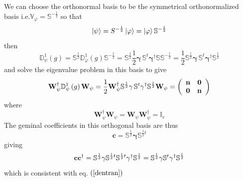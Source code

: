 \documentclass[aps,preprint]{revtex4}
\begin{document}
We can choose the orthonormal basis to be the symmetrical orthonormalized
basis i.e.$\mathbb{V}_{\varphi }=\mathbb{S}^{-\frac{1}{2}}$ so that 
\begin{equation}
\left\vert \mathbf{\psi }\right\rangle =S^{-\frac{1}{2}}\left\vert \mathbf{%
\varphi }\right\rangle =\left\vert \mathbf{\varphi }\right\rangle \mathbb{S}%
^{-\frac{1}{2}}
\end{equation}%
then 
\begin{equation}
\mathbb{D}_{\psi }^{1}\left( g\right) =\mathbb{S}^{\frac{1}{2}}\mathbb{D}%
_{\varphi }^{1}\left( g\right) \mathbb{S}^{-\frac{1}{2}}=\mathbb{S}^{\frac{1%
}{2}}\frac{1}{2}\mathbf{\gamma \,}\mathbb{S}^{t}\mathbf{\gamma }^{\dagger }%
\mathbb{SS}^{-\frac{1}{2}}=\frac{1}{2}\mathbb{S}^{\frac{1}{2}}\mathbf{\gamma
\,}\mathbb{S}^{t}\mathbf{\gamma }^{\dagger }\mathbb{S}^{\frac{1}{2}}
\end{equation}%
and solve the eigenvalue problem in this basis to give 
\begin{equation}
\mathbf{W}_{\psi }^{\dagger }\mathbb{D}_{\psi }^{1}\left( g\right) \mathbf{W}%
_{\psi }=\frac{1}{2}\mathbf{W}_{\psi }^{\dagger }\mathbb{S}^{\frac{1}{2}}%
\mathbf{\gamma \,}\mathbb{S}^{t}\mathbf{\gamma }^{\dagger }\mathbb{S}^{\frac{%
1}{2}}\mathbf{W}_{\psi }=\left( 
\begin{array}{cc}
\mathbf{n} & \mathbf{0} \\ 
\mathbf{0} & \mathbf{n}%
\end{array}%
\right)
\end{equation}%
where 
\begin{equation}
\mathbf{W}_{\psi }^{\dagger }\mathbf{W}_{\psi }=\mathbf{W}_{\psi }\mathbf{W}%
_{\psi }^{\dagger }=\mathbb{I}_{r}
\end{equation}%
The geminal coefficients in this orthogonal basis are thus 
\begin{equation}
\mathbf{c}=\mathbb{S}^{\frac{1}{2}}\mathbf{\gamma }\mathbb{S}^{\frac{1}{2}t}
\end{equation}%
giving 
\begin{equation}
\mathbf{cc}^{\dagger }=\mathbb{S}^{\frac{1}{2}}\mathbf{\gamma }\mathbb{S}^{%
\frac{1}{2}t}\mathbb{S}^{\frac{1}{2}t}\mathbf{\gamma }^{\dagger }\mathbb{S}^{%
\frac{1}{2}}=\mathbb{S}^{\frac{1}{2}}\mathbf{\gamma }\mathbb{S}^{t}\mathbf{%
\gamma }^{\dagger }\mathbb{S}^{\frac{1}{2}}
\end{equation}%
which is consistent with eq. $\left( \ref{dentran}\right) $
\end{document}
